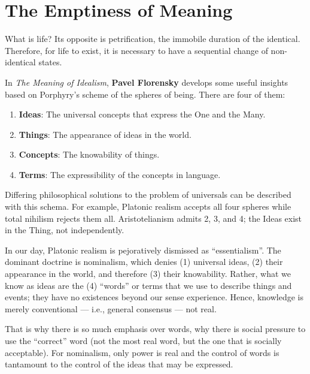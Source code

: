 \section{The Emptiness of Meaning}

\begin{quotex}
What is life? Its opposite is petrification, the immobile duration of the identical. Therefore, for life to exist, it is necessary to have a sequential change of non-identical states.
\end{quotex}


In \emph{The Meaning of Idealism}, \textbf{Pavel Florensky} develops some useful insights based on Porphyry's scheme of the spheres of being. There are four of them:

\begin{enumerate}


\item \textbf{Ideas}: The universal concepts that express the One and the Many.

\item \textbf{Things}: The appearance of ideas in the world.

\item \textbf{Concepts}: The knowability of things.

\item \textbf{Terms}: The expressibility of the concepts in language.

\end{enumerate}


Differing philosophical solutions to the problem of universals can be described with this schema. For example, Platonic realism accepts all four spheres while total nihilism rejects them all. Aristotelianism admits 2, 3, and 4; the Ideas exist in the Thing, not independently.

In our day, Platonic realism is pejoratively dismissed as ``essentialism''. The dominant doctrine is nominalism, which denies (1) universal ideas, (2) their appearance in the world, and therefore (3) their knowability. Rather, what we know as ideas are the (4) ``words'' or terms that we use to describe things and events; they have no existences beyond our sense experience. Hence, knowledge is merely conventional --- i.e., general consensus --- not real.

That is why there is so much emphasis over words, why there is social pressure to use the ``correct'' word (not the most real word, but the one that is socially acceptable). For nominalism, only power is real and the control of words is tantamount to the control of the ideas that may be expressed.

